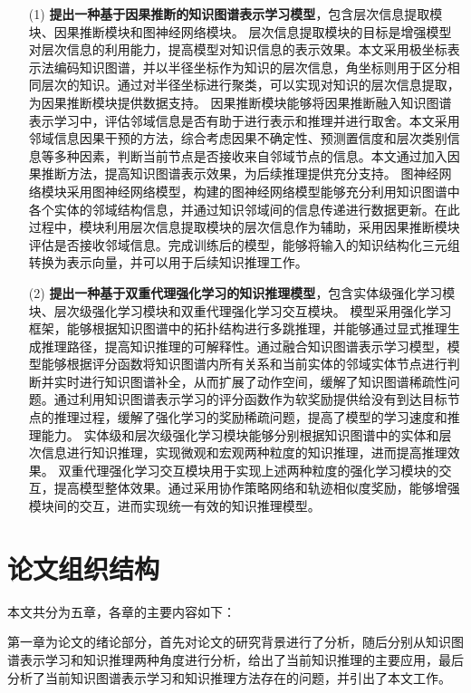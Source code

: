\documentclass[algorithmlist, AutoFakeBold, AutoFakeSlant, figurelist, tablelist, nomlist, masters]{seuthesix}
\begin{document}
\begin{itemize}
  \item [(1)]
  \textbf{提出一种基于因果推断的知识图谱表示学习模型}，包含层次信息提取模块、因果推断模块和图神经网络模块。
  层次信息提取模块的目标是增强模型对层次信息的利用能力，提高模型对知识信息的表示效果。本文采用极坐标表示法编码知识图谱，并以半径坐标作为知识的层次信息，角坐标则用于区分相同层次的知识。通过对半径坐标进行聚类，可以实现对知识的层次信息提取，为因果推断模块提供数据支持。
  因果推断模块能够将因果推断融入知识图谱表示学习中，评估邻域信息是否有助于进行表示和推理并进行取舍。本文采用邻域信息因果干预的方法，综合考虑因果不确定性、预测置信度和层次类别信息等多种因素，判断当前节点是否接收来自邻域节点的信息。本文通过加入因果推断方法，提高知识图谱表示效果，为后续推理提供充分支持。
  图神经网络模块采用图神经网络模型，构建的图神经网络模型能够充分利用知识图谱中各个实体的邻域结构信息，并通过知识邻域间的信息传递进行数据更新。在此过程中，模块利用层次信息提取模块的层次信息作为辅助，采用因果推断模块评估是否接收邻域信息。完成训练后的模型，能够将输入的知识结构化三元组转换为表示向量，并可以用于后续知识推理工作。
  \item [(2)]
  \textbf{提出一种基于双重代理强化学习的知识推理模型}，包含实体级强化学习模块、层次级强化学习模块和双重代理强化学习交互模块。
  模型采用强化学习框架，能够根据知识图谱中的拓扑结构进行多跳推理，并能够通过显式推理生成推理路径，提高知识推理的可解释性。通过融合知识图谱表示学习模型，模型能够根据评分函数将知识图谱内所有关系和当前实体的邻域实体节点进行判断并实时进行知识图谱补全，从而扩展了动作空间，缓解了知识图谱稀疏性问题。通过利用知识图谱表示学习的评分函数作为软奖励提供给没有到达目标节点的推理过程，缓解了强化学习的奖励稀疏问题，提高了模型的学习速度和推理能力。
  实体级和层次级强化学习模块能够分别根据知识图谱中的实体和层次信息进行知识推理，实现微观和宏观两种粒度的知识推理，进而提高推理效果。
  双重代理强化学习交互模块用于实现上述两种粒度的强化学习模块的交互，提高模型整体效果。通过采用协作策略网络和轨迹相似度奖励，能够增强模块间的交互，进而实现统一有效的知识推理模型。
\end{itemize}


\section{论文组织结构}
本文共分为五章，各章的主要内容如下：

第一章为论文的绪论部分，首先对论文的研究背景进行了分析，随后分别从知识图谱表示学习和知识推理两种角度进行分析，给出了当前知识推理的主要应用，最后分析了当前知识图谱表示学习和知识推理方法存在的问题，并引出了本文工作。
\end{document}
